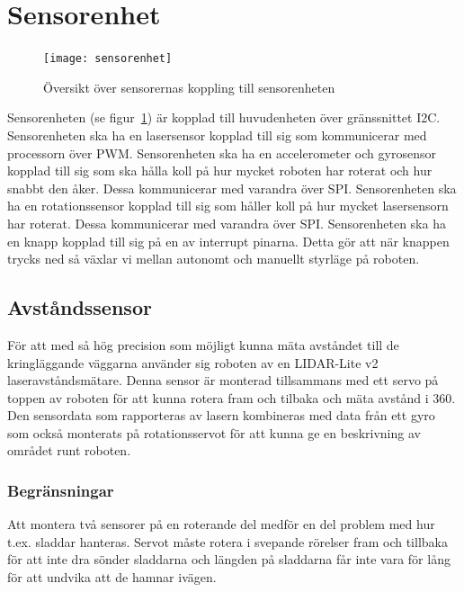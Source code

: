 \documentclass{article}
\begin{document}
\section{Sensorenhet}

\begin{figure}[H]
\centering
\texttt{[image: sensorenhet]}
\caption{Översikt över sensorernas koppling till sensorenheten}
\label{fig:sensorenhet}
\end{figure}
Sensorenheten (se figur~\ref{fig:sensorenhet}) är kopplad till huvudenheten över gränssnittet I2C.\newline\newline
Sensorenheten ska ha en lasersensor kopplad till sig som kommunicerar med processorn över PWM.\newline\newline
Sensorenheten ska ha en accelerometer och gyrosensor kopplad till sig som ska hålla koll på hur mycket roboten har roterat och hur snabbt den åker. Dessa kommunicerar med varandra över SPI. \newline\newline
Sensorenheten ska ha en rotationssensor kopplad till sig som håller koll på hur mycket lasersensorn har roterat. Dessa kommunicerar med varandra över SPI. \newline\newline
Sensorenheten ska ha en knapp kopplad till sig på en av interrupt pinarna. Detta gör att när knappen trycks ned så växlar vi mellan autonomt och manuellt styrläge på roboten. \newline\newline

\subsection{Avståndssensor}
För att med så hög precision som möjligt kunna mäta avståndet till de kringläggande väggarna använder sig roboten av en LIDAR-Lite v2 laseravståndsmätare. Denna sensor är monterad tillsammans med ett servo på toppen av roboten för att kunna rotera fram och tilbaka och mäta avstånd i 360\textdegree. Den sensordata som rapporteras av lasern kombineras med data från ett gyro som också monterats på rotationsservot för att kunna ge en beskrivning av området runt roboten.

\subsubsection{Begränsningar}
Att montera två sensorer på en roterande del medför en del problem med hur t.ex. sladdar hanteras. Servot måste rotera i svepande rörelser fram och tillbaka för att inte dra sönder sladdarna och längden på sladdarna får inte vara för lång för att undvika att de hamnar ivägen.
\end{document}
